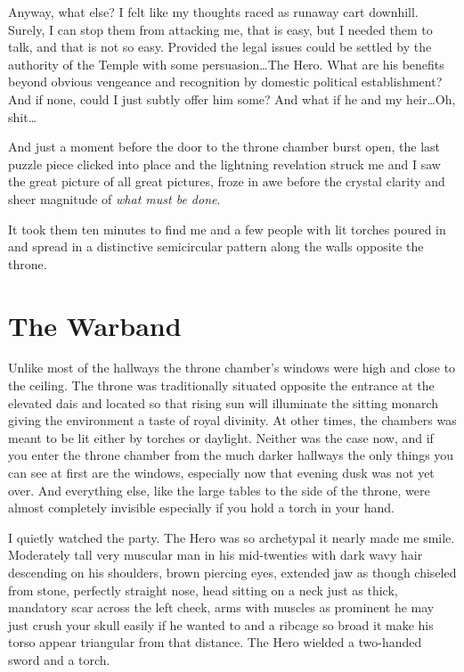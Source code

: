 Anyway, what else? I felt like my thoughts raced as runaway cart downhill. Surely, I can stop them from attacking me, that is easy, but I needed them to talk, and that is not so easy. Provided the legal issues could be settled by the authority of the Temple with some persuasion\dots The Hero. What are his benefits beyond obvious vengeance and recognition by domestic political establishment? And if none, could I just subtly offer him some? And what if he and my heir\dots Oh, shit\dots

And just a moment before the door to the throne chamber burst open, the last puzzle piece clicked into place and the lightning revelation struck me and I saw the great picture of all great pictures, froze in awe before the crystal clarity and sheer magnitude of \textit{what must be done}.

It took them ten minutes to find me and a few people with lit torches poured in and spread in a distinctive semicircular pattern along the walls opposite the throne.

\section{The Warband}

Unlike most of the hallways the throne chamber’s windows were high and close to the ceiling. The throne was traditionally situated opposite the entrance at the elevated dais and located so that rising sun will illuminate the sitting monarch giving the environment a taste of royal divinity. At other times, the chambers was meant to be lit either by torches or daylight. Neither was the case now, and if you enter the throne chamber from the much darker hallways the only things you can see at first are the windows, especially now that evening dusk was not yet over. And everything else, like the large tables to the side of the throne, were almost completely invisible especially if you hold a torch in your hand.

I quietly watched the party. The Hero was so archetypal it nearly made me smile. Moderately tall very muscular man in his mid-twenties with dark wavy hair descending on his shoulders, brown piercing eyes, extended jaw as though chiseled from stone, perfectly straight nose, head sitting on a neck just as thick, mandatory scar across the left cheek, arms with muscles as prominent he may just crush your skull easily if he wanted to and a ribcage so broad it make his torso appear triangular from that distance. The Hero wielded a two-handed sword and a torch.

